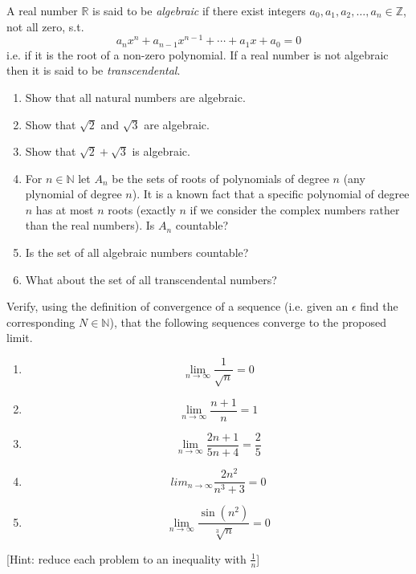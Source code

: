 \documentclass[11pt]{article}%
\newcommand{\R}{\mathbb{R}}
\newcommand{\N}{\mathbb{N}}
\begin{document}
\begin{Exercise}[title=***]
	A real number $\R$ is said to be \emph{algebraic} if there exist integers $a_0, a_1, a_2,\dots, a_n\in\mathbb{Z}$, not all zero, s.t. 
	\[a_n x^n + a_{n-1}x^{n-1}+\cdots+ a_1x + a_0 =0\]
	i.e. if it is the root of a non-zero polynomial. If a real number is not algebraic then it is said to be \emph{transcendental}.
	\begin{enumerate}[label={\alph*)}]
		\item Show that all natural numbers are algebraic.
		\item Show that $\sqrt 2$ and $\sqrt 3$ are algebraic.
		\item Show that $\sqrt2 + \sqrt3$ is algebraic.
		\item For $n\in\N$ let $A_n$ be the sets of roots of polynomials of degree $n$ (any plynomial of degree $n$). It is a known fact that a specific polynomial of degree $n$ has at most $n$ roots (exactly $n$ if we consider the complex numbers rather than the real numbers). Is $A_n$ countable?
		\item Is the set of all algebraic numbers countable?
		\item What about the set of all transcendental numbers?
	\end{enumerate}
\end{Exercise}

\begin{Exercise}[title=**$\dagger$]
	Verify, using the definition of convergence of a sequence (i.e. given an $\epsilon$ find the corresponding $N\in\N$), that the following sequences converge to the proposed limit.
	\begin{enumerate}[label={\alph*)}]
		\item \[\lim_{n\to\infty} \frac{1}{\sqrt n} = 0\]
		\item \[\lim_{n\to\infty} \frac{n+1}{n} = 1\]
		\item \[\lim_{n\to\infty} \frac{2n+1}{5n+4} = \frac{2}{5}\]
		\item \[lim_{n\to\infty} \frac{2n^2}{n^3+3} = 0\]
		\item \[\lim_{n\to\infty} \frac{\sin(n^2)}{\sqrt[3]{n}} = 0\]
	\end{enumerate}
	[Hint: reduce each problem to an inequality with $\frac{1}{n}$]
\end{Exercise}
\end{document}
